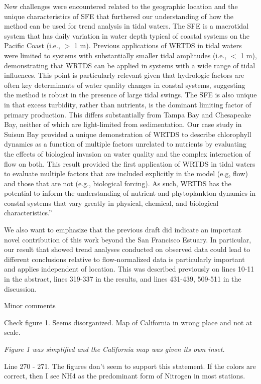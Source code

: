 \documentclass[letterpaper,12pt]{article}
\begin{document}
{New challenges were encountered related to the geographic location and the unique characteristics of SFE that furthered our understanding of how the method can be used for trend analysis in tidal waters.  The SFE is a macrotidal system that has daily variation in water depth typical of coastal systems on the Pacific Coast (i.e., $>$ 1 m).  Previous applications of WRTDS in tidal waters were limited to systems with substantially smaller tidal amplitudes (i.e., $<$ 1 m), demonstrating that WRTDS can be applied in systems with a wide range of tidal influences.  This point is particularly relevant given that hydrologic factors are often key determinants of water quality changes in coastal systems, suggesting the method is robust in the presence of large tidal swings. The SFE is also unique in that excess turbidity, rather than nutrients, is the dominant limiting factor of primary production.  This differs substantially from Tampa Bay and Chesapeake Bay, neither of which are light-limited from sedimentation.  Our case study in Suisun Bay provided a unique demonstration of WRTDS to describe chlorophyll dynamics as a function of multiple factors unrelated to nutrients by evaluating the effects of biological invasion on water quality and the complex interaction of flow on both. This result provided the first application of WRTDS in tidal waters to evaluate multiple factors that are included explicitly in the model (e.g, flow) and those that are not (e.g., biological forcing). As such, WRTDS has the potential to inform the understanding of nutrient and phytoplankton dynamics in coastal systems that vary greatly in physical, chemical, and biological characteristics.''

We also want to emphasize that the previous draft did indicate an important novel contribution of this work beyond the San Francisco Estuary.  In particular, our result that showed trend analyses conducted on observed data could lead to different conclusions relative to flow-normalized data is particularly important and applies independent of location.  This was described previously on lines 10-11 in the abstract, lines 319-337 in the results, and lines 431-439, 509-511 in the discussion.  
}

Minor comments

Check figure 1. Seems disorganized. Map of California in wrong place and not at scale.

{\it Figure 1 was simplified and the California map was given its own inset.}

Line  270 - 271. The figures don't seem to support this statement. If the colors are correct, then I see NH4 as the predominant form of Nitrogen in most stations. 
\end{document}
